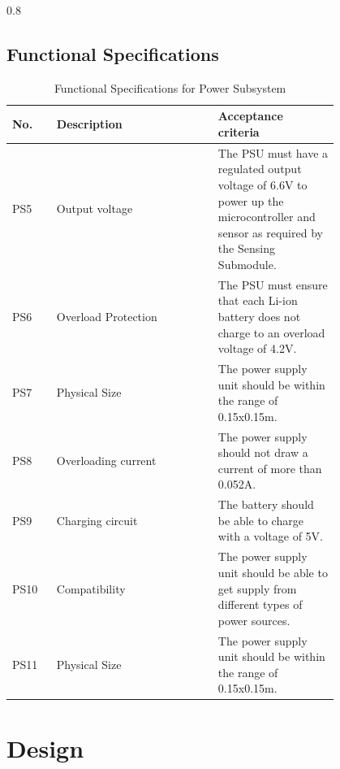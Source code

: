 \documentclass[class=report,11pt,crop=false]{standalone}
\begin{document}
\begin{table}[h!]
\begin{tabularx}{0.8\textwidth}
{{	\subsection{Functional Specifications}
	\begin{table}[h!]
		\centering
		\caption{Functional Specifications for Power Subsystem}
		\label{tab:P2}
		\begin{tabularx}{0.8\textwidth}{|>{\centering\arraybackslash}m{0.1\linewidth}|>{\centering\arraybackslash}m{0.4\linewidth}|>{\centering\arraybackslash}m{0.3\linewidth}|}
			\hline
			\textbf{No.} & \textbf{Description} & \textbf{Acceptance criteria} \\
			\hline
			PS5 & Output voltage & The PSU must have a regulated output voltage of 6.6V to power up the microcontroller and sensor as required by the Sensing Submodule. \\
			\hline
			PS6 & Overload Protection & The PSU must ensure that each Li-ion battery does not charge to an overload voltage of 4.2V. \\
			\hline
			PS7 & Physical Size & The power supply unit should be within the range of 0.15x0.15m. \\
			\hline
			PS8 & Overloading current & The power supply should not draw a current of more than 0.052A. \\
			\hline
			PS9 & Charging circuit & The battery should be able to charge with a voltage of 5V. \\
			\hline
			PS10 & Compatibility & The power supply unit should be able to get supply from different types of power sources. \\
			\hline
			PS11 & Physical Size & The power supply unit should be within the range of 0.15x0.15m. \\
			\hline
		\end{tabularx}
	\end{table}
	
	\section{Design}
}}
\end{tabularx}
\end{table}
\end{document}
